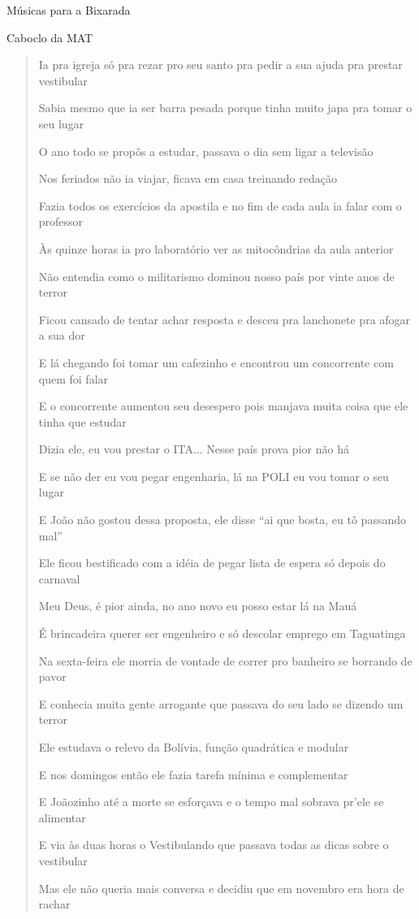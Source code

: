\begin{secao}{Músicas para a Bixarada}
\begin{subsecao}{Caboclo da MAT}
\begin{verse}
Ia pra igreja só pra rezar pro seu santo pra pedir a sua ajuda pra prestar
vestibular

Sabia mesmo que ia ser barra pesada porque tinha muito japa pra tomar o seu
lugar

O ano todo se propôs a estudar, passava o dia sem ligar a televisão

Nos feriados não ia viajar, ficava em casa treinando redação

Fazia todos os exercícios da apostila e no fim de cada aula ia falar com o
professor

Às quinze horas ia pro laboratório ver as mitocôndrias da aula anterior

Não entendia como o militarismo dominou nosso país por vinte anos de terror

Ficou cansado de tentar achar resposta e desceu pra lanchonete pra afogar a sua
dor

E lá chegando foi tomar um cafezinho e encontrou um concorrente com quem foi
falar

E o concorrente aumentou seu desespero pois manjava muita coisa que ele tinha
que estudar

Dizia ele, eu vou prestar o ITA... Nesse país prova pior não há

E se não der eu vou pegar engenharia, lá na POLI eu vou tomar o seu lugar

E João não gostou dessa proposta, ele disse ``ai que bosta, eu tô passando mal''

Ele ficou bestificado com a idéia de pegar lista de espera só depois do carnaval

Meu Deus, é pior ainda, no ano novo eu posso estar lá na Mauá

É brincadeira querer ser engenheiro e só descolar emprego em Taguatinga

Na sexta-feira ele morria de vontade de correr pro banheiro se borrando de pavor

E conhecia muita gente arrogante que passava do seu lado se dizendo um terror

Ele estudava o relevo da Bolívia, função quadrática e modular

E nos domingos então ele fazia tarefa mínima e complementar

E Joãozinho até a morte se esforçava e o tempo mal sobrava pr'ele se alimentar

E via às duas horas o Vestibulando que passava todas as dicas sobre o vestibular

Mas ele não queria mais conversa e decidiu que em novembro era hora de rachar


\end{verse}
\end{subsecao}
\end{secao}
